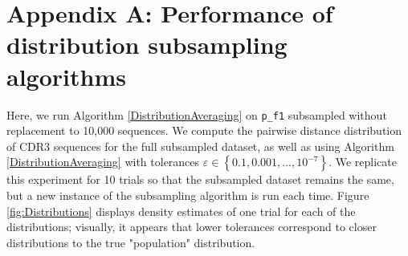 \documentclass{article}
\begin{document}
\section*{Appendix A: Performance of distribution subsampling algorithms}
Here, we run Algorithm \ref{DistributionAveraging} on \texttt{p\_f1} subsampled without replacement to 10,000 sequences.
We compute the pairwise distance distribution of CDR3 sequences for the full subsampled dataset, as well as using Algorithm \ref{DistributionAveraging} with tolerances $\varepsilon \in \left\{0.1, 0.001, \dotsc, 10^{-7} \right\}$.
We replicate this experiment for 10 trials so that the subsampled dataset remains the same, but a new instance of the subsampling algorithm is run each time.
Figure \ref{fig:Distributions} displays density estimates of one trial for each of the distributions; visually, it appears that lower tolerances correspond to closer distributions to the true "population" distribution.
\end{document}
